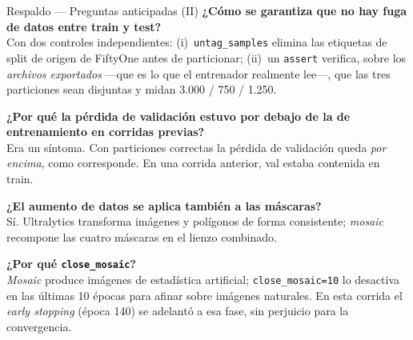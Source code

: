 \documentclass[aspectratio=169,11pt]{beamer}
\begin{document}
\begin{frame}{Respaldo --- Preguntas anticipadas (II)}
  \small
  \textbf{¿Cómo se garantiza que no hay fuga de datos entre train y test?}\\
  Con dos controles independientes: (i)~\texttt{untag\_samples} elimina las etiquetas de
  split de origen de FiftyOne antes de particionar; (ii)~un \texttt{assert} verifica, sobre
  los \emph{archivos exportados} —que es lo que el entrenador realmente lee—, que las tres
  particiones sean disjuntas y midan 3.000 / 750 / 1.250.
  \vspace{0.6em}

  \textbf{¿Por qué la pérdida de validación estuvo por debajo de la de entrenamiento en
  corridas previas?}\\
  Era un síntoma. Con particiones correctas la pérdida de validación queda \emph{por
  encima}, como corresponde. En una corrida anterior, val estaba contenida en train.
  \vspace{0.6em}

  \textbf{¿El aumento de datos se aplica también a las máscaras?}\\
  Sí. Ultralytics transforma imágenes y polígonos de forma consistente; \emph{mosaic}
  recompone las cuatro máscaras en el lienzo combinado.
  \vspace{0.6em}

  \textbf{¿Por qué \texttt{close\_mosaic}?}\\
  \emph{Mosaic} produce imágenes de estadística artificial; \texttt{close\_mosaic=10} lo
  desactiva en las últimas 10 épocas para afinar sobre imágenes naturales. En esta corrida
  el \emph{early stopping} (época 140) se adelantó a esa fase, sin perjuicio para la
  convergencia.
\end{frame}
\end{document}
